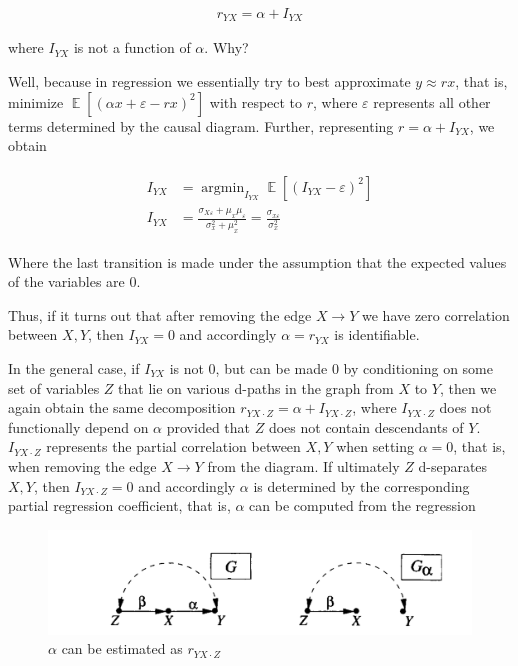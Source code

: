 \documentclass[fleqn]{article}
\DeclareMathOperator{\E}{\mathop\mathbb{E}}
\DeclareMathOperator*{\argmin}{argmin}
\numberwithin{equation}{section}
\numberwithin{theorem}{section}
\numberwithin{figure}{section}
\numberwithin{lemma}{section}
\numberwithin{corollary}{section}
\begin{document}
\begin{align}
	r_{YX} = \alpha + I_{YX}
\end{align}

where $I_{YX}$ is not a function of $\alpha$. Why?

Well, because in regression we essentially try to best approximate $y \approx rx$, that is, minimize $\E[(\alpha x + \varepsilon - rx)^2]$ with respect to $r$, where $\varepsilon$ represents all other terms determined by the causal diagram. Further, representing $r = \alpha + I_{YX}$, we obtain

\begin{align}
	\begin{split}
		I_{YX} &= \argmin_{I_{YX}}\E[(I_{YX} - \varepsilon)^2] \\
		I_{YX} &= \frac{\sigma_{X\varepsilon} + \mu_x\mu_\varepsilon}{\sigma_x^2 + \mu_x^2} =  \frac{\sigma_{x\varepsilon}}{\sigma_x^2}
	\end{split}
\end{align}

Where the last transition is made under the assumption that the expected values of the variables are 0.

Thus, if it turns out that after removing the edge $X\to Y$ we have zero correlation between $X,Y$, then $I_{YX} = 0$ and accordingly $\alpha = r_{YX}$ is identifiable.

In the general case, if $I_{YX}$ is not 0, but can be made 0 by conditioning on some set of variables $Z$ that lie on various d-paths in the graph from $X$ to $Y$, then we again obtain the same decomposition $r_{YX\cdot Z} = \alpha + I_{YX\cdot Z}$, where $I_{YX\cdot Z}$ does not functionally depend on $\alpha$ provided that $Z$ does not contain descendants of $Y$. $I_{YX\cdot Z}$ represents the partial correlation between $X,Y$ when setting $\alpha = 0$, that is, when removing the edge $X \to Y$ from the diagram. If ultimately $Z$ d-separates $X,Y$, then $I_{YX\cdot Z} = 0$ and accordingly $\alpha$ is determined by the corresponding partial regression coefficient, that is, $\alpha$ can be computed from the regression

\begin{figure}[h]
	\begin{center}
		\includegraphics[scale=0.6]{imgs/img31.png}
	\end{center}
	\caption{$\alpha$ can be estimated as $r_{YX\cdot Z}$}
	\label{fig:path_coef_estimation}
\end{figure}
\end{document}
